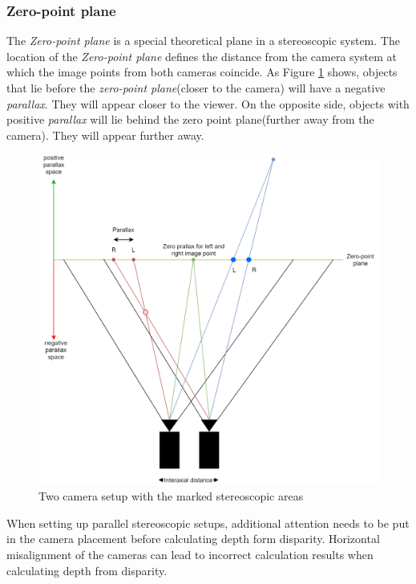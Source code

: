 \subsubsection{Zero-point plane}
The\textit{ Zero-point plane} is a special theoretical plane in a stereoscopic system. The location of the  \textit{Zero-point plane} defines the distance from the camera system at which the image points from both cameras coincide. As Figure \ref{img:stereo_diagram} shows, objects that lie before the \textit{zero-point plane}(closer to the camera) will have a negative \textit{parallax}. They will appear closer to the viewer. On the opposite side, objects with positive \textit{parallax} will lie behind the zero point plane(further away from the camera). They will appear further away.
\begin{figure}[H]
\includegraphics[width=\textwidth]{images/Stereo_diagram.png}
\caption{Two camera setup with the marked stereoscopic areas}
\label{img:stereo_diagram} 
\end{figure}
When setting up parallel stereoscopic setups, additional attention needs to be put in the camera placement before calculating depth form disparity. Horizontal misalignment of the cameras can lead to incorrect calculation results when calculating depth from disparity.
